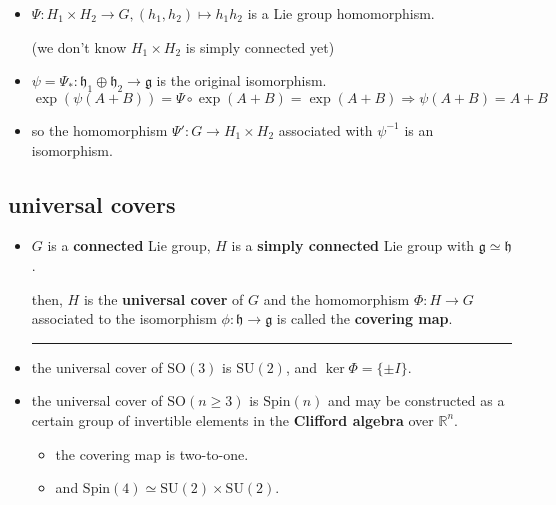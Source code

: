 \begin{itemize}
\begin{tcolorbox}[title=proof:]
\begin{itemize}
			\item $\Psi : H_1 \times H_2 \rightarrow G, (h_1, h_2) \mapsto h_1 h_2$ is a Lie group homomorphism.
			
			(we don't know $H_1 \times H_2$ is simply connected yet)
			
			\item $\psi = \Psi_* : \mathfrak{h}_1 \oplus \mathfrak{h}_2 \rightarrow \mathfrak{g}$ is the original isomorphism.
			\begin{equation}
				\exp(\psi(A + B)) = \Psi \circ \exp(A + B) = \exp(A + B) \Longrightarrow \psi(A + B) = A + B
			\end{equation}
			
			\item so the homomorphism $\Psi' : G \rightarrow H_1 \times H_2$ associated with $\psi^{- 1}$ is an isomorphism.
		\end{itemize}
	\end{tcolorbox}
\end{itemize}

\subsection{universal covers} \label{subsection 5.1.2}
\begin{itemize}
	\item $G$ is a \textbf{connected} Lie group, $H$ is a \textbf{simply connected} Lie group with $\mathfrak{g} \simeq \mathfrak{h}$.
	
	then, $H$ is the \textbf{universal cover} of $G$ and the homomorphism $\Phi : H \rightarrow G$ associated to the isomorphism $\phi : \mathfrak{h} \rightarrow \mathfrak{g}$ is called the \textbf{covering map}.
	
	\noindent\rule[0.5ex]{\linewidth}{0.5pt} %
	
	\item the universal cover of $\mathrm{SO}(3)$ is $\mathrm{SU}(2)$, and $\ker \Phi = \{\pm I\}$.
	
	\item the universal cover of $\mathrm{SO}(n \geq 3)$ is $\mathrm{Spin}(n)$ and may be constructed as a certain group of invertible elements in the \textbf{Clifford algebra} over $\mathbb{R}^n$.
	\begin{itemize}
		\item the covering map is two-to-one.
		
		\item and $\mathrm{Spin}(4) \simeq \mathrm{SU}(2) \times \mathrm{SU}(2)$.
	\end{itemize}
\end{itemize}


